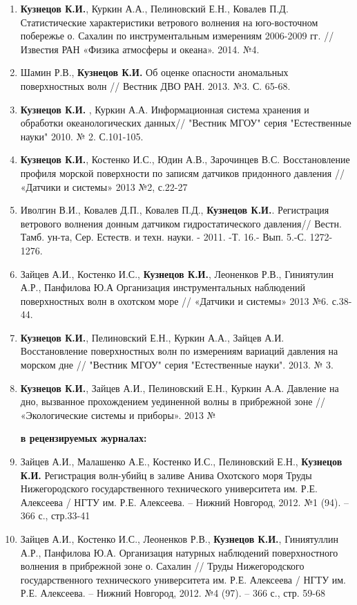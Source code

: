\begin{enumerate}
  \item \textbf{Кузнецов К.И.}, Куркин А.А., Пелиновский Е.Н., Ковалев П.Д. Статистические характеристики ветрового волнения на юго-восточном побережье о. Сахалин по инструментальным измерениям 2006-2009 гг. // Известия РАН «Физика атмосферы и океана». 2014. №4.
  \item Шамин Р.В., \textbf{Кузнецов К.И.} Об оценке опасности аномальных поверхностных волн // Вестник ДВО РАН. 2013. №3. С. 65-68.
  \item \textbf{Кузнецов К.И.} , Куркин А.А. Информационная система хранения и обработки океанологических данных// "Вестник МГОУ" серия "Естественные науки" 2010. № 2.  С.101-105.
  \item \textbf{Кузнецов К.И.}, Костенко И.С., Юдин А.В., Зарочинцев В.С. Восстановление профиля морской поверхности по записям датчиков придонного давления  // «Датчики и системы» 2013 №2, с.22-27
  \item Иволгин В.И., Ковалев Д.П., Ковалев П.Д., \textbf{Кузнецов К.И.}. Регистрация ветрового волнения донным датчиком гидростатического давления// Вестн. Тамб. ун-та, Сер. Естеств. и техн. науки. - 2011. -Т. 16.- Вып. 5.-С. 1272-1276.
  \item Зайцев А.И., Костенко И.С., \textbf{Кузнецов К.И.}, Леоненков Р.В., Гиниятулин А.Р., Панфилова Ю.А    Организация инструментальных наблюдений поверхностных волн в охотском море // «Датчики и системы» 2013 №6. с.38-44.
  \item \textbf{Кузнецов К.И.}, Пелиновский Е.Н., Куркин А.А., Зайцев А.И. Восстановление поверхностных волн по измерениям  вариаций давления на морском дне // "Вестник МГОУ" серия "Естественные науки". 2013. № 3.  %
  \item \textbf{Кузнецов К.И.}, Зайцев А.И., Пелиновский Е.Н., Куркин А.А. Давление на дно, вызванное прохождением уединенной волны в прибрежной зоне // «Экологические системы и приборы». 2013 №

\textbf{в рецензируемых журналах:}

  \item Зайцев А.И., Малашенко А.Е., Костенко И.С., Пелиновский Е.Н., \textbf{Кузнецов К.И.} Регистрация волн-убийц в заливе Анива Охотского моря  Труды Нижегородского государственного технического университета им. Р.Е. Алексеева / НГТУ им.  Р.Е. Алексеева. – Нижний Новгород, 2012. №1 (94). – 366 с., стр.33-41
  \item Зайцев А.И., Костенко И.С., Леоненков Р.В., \textbf{Кузнецов К.И.}, Гиниятуллин А.Р., Панфилова Ю.А. Организация натурных наблюдений поверхностного волнения в прибрежной зоне о. Сахалин // Труды Нижегородского государственного технического университета им. Р.Е. Алексеева / НГТУ им.  Р.Е. Алексеева. – Нижний Новгород, 2012. №4 (97). – 366 с., стр. 59-68
      

\end{enumerate}
